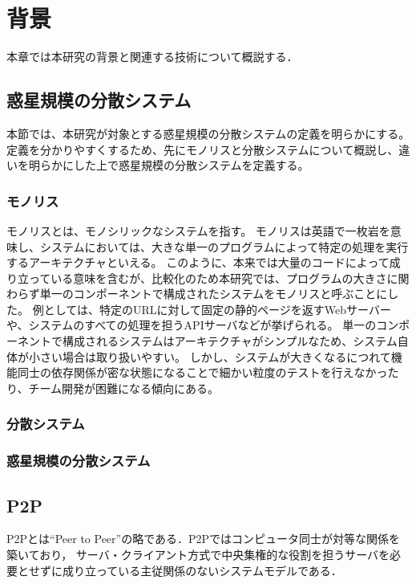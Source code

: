 \chapter{背景}
\label{background}

本章では本研究の背景と関連する技術について概説する．

\section{惑星規模の分散システム}

本節では、本研究が対象とする惑星規模の分散システムの定義を明らかにする。
定義を分かりやすくするため、先にモノリスと分散システムについて概説し、違いを明らかにした上で惑星規模の分散システムを定義する。

\subsection{モノリス}

モノリスとは、モノシリックなシステムを指す。
モノリスは英語で一枚岩を意味し、システムにおいては、大きな単一のプログラムによって特定の処理を実行するアーキテクチャといえる。
このように、本来では大量のコードによって成り立っている意味を含むが、比較化のため本研究では、プログラムの大きさに関わらず単一のコンポーネントで構成されたシステムをモノリスと呼ぶことにした。
例としては、特定のURLに対して固定の静的ページを返すWebサーバーや、システムのすべての処理を担うAPIサーバなどが挙げられる。
単一のコンポーネントで構成されるシステムはアーキテクチャがシンプルなため、システム自体が小さい場合は取り扱いやすい。
しかし、システムが大きくなるにつれて機能同士の依存関係が密な状態になることで細かい粒度のテストを行えなかったり、チーム開発が困難になる傾向にある。

\subsection{分散システム}



\subsection{惑星規模の分散システム}

\section{P2P}

P2Pとは``Peer to Peer''の略である．P2Pではコンピュータ同士が対等な関係を築いており，
サーバ・クライアント方式で中央集権的な役割を担うサーバを必要とせずに成り立っている主従関係のないシステムモデルである．

